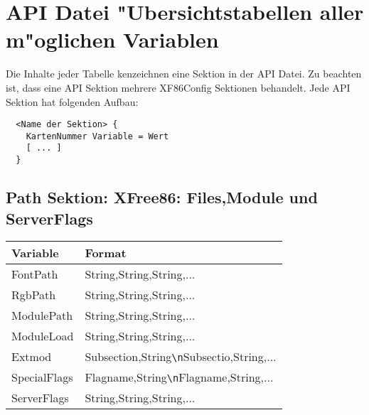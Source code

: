 \section{API Datei "Ubersichtstabellen aller m"oglichen Variablen}
Die Inhalte jeder Tabelle kenzeichnen eine Sektion in der API Datei. 
Zu beachten ist, dass eine API Sektion mehrere XF86Config Sektionen 
behandelt. Jede API Sektion hat folgenden Aufbau:
\begin{verbatim}
  <Name der Sektion> {
    KartenNummer Variable = Wert
    [ ... ]
  }
\end{verbatim}

\subsection{Path Sektion: XFree86: Files,Module und ServerFlags}
\begin{tabular}[h]{|p{5cm}|p{7cm}|}
 \hline
 \textbf{Variable}  & \textbf{Format}                \\
 \hline
 FontPath     & String,String,String,...                       \\
 RgbPath      & String,String,String,...                       \\ 
 ModulePath   & String,String,String,...                       \\
 ModuleLoad   & String,String,String,...                       \\
 Extmod       & Subsection,String\verb+\n+Subsectio,String,... \\ 
 SpecialFlags & Flagname,String\verb+\n+Flagname,String,...    \\
 ServerFlags  & String,String,String,...                       \\
 \hline
\end{tabular}

